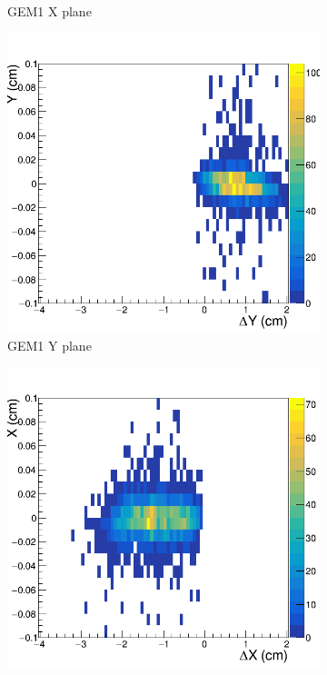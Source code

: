 \begin{figure}[h!]
\begin{subfigure}[l]{.45\textwidth}
   \caption{GEM1 X plane}
   \label{fig:GEM1X_before}
 \end{subfigure}
 \begin{subfigure}[r]{.45\textwidth}
   \centering
   \includegraphics[width=\linewidth]{thesis_figures/alignment/Run_3211_T/G1Y_after_millepede_U.png}
   \caption{GEM1 Y plane}
   \label{fig:GEM1Y_before}
 \end{subfigure}
 \hfill
 \begin{subfigure}[l]{.45\textwidth}
   \centering
   \includegraphics[width=\linewidth]{thesis_figures/alignment/Run_3211_T/G2X_after_millepede_U.png}

\end{subfigure}
\end{figure}
